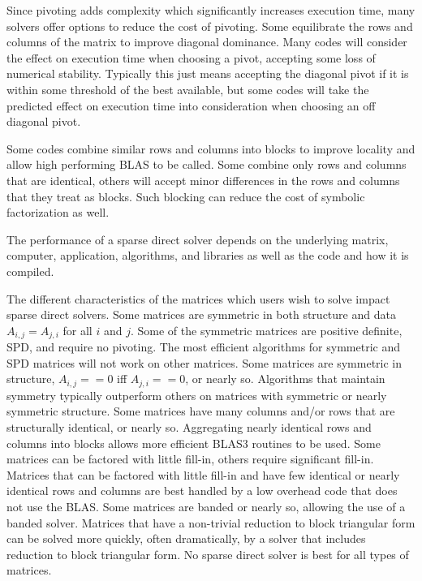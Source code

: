 \documentclass[acmtocl]{acmtrans2m}
\begin{document}
Since pivoting adds complexity which significantly increases execution
time, many solvers offer options to reduce the cost of pivoting\cite{LiDemmel509092,sg:04-fgc}.  Some
equilibrate the rows and columns of the matrix to improve diagonal
dominance.  Many codes will consider the effect on execution time when
choosing a pivot, accepting some loss of numerical stability\cite{Malard126136}.
Typically this just means accepting the diagonal pivot if it is within
some threshold of the best available, but some codes will take the
predicted effect on execution time into consideration when choosing an off
diagonal pivot\cite{Davis992205}.

Some codes combine similar rows and columns into blocks to improve
locality and allow high performing BLAS to be called.  Some combine
only rows and columns that are identical, others will accept minor
differences in the rows and columns that they treat as blocks.  Such
blocking can reduce the cost of symbolic factorization as well\cite{amestoy01analysis}.

The performance of a sparse direct solver depends on the underlying
matrix, computer, application, algorithms, and libraries as well as
the code and how it is compiled.  

The different characteristics of the matrices which users wish to
solve impact sparse direct solvers.  Some matrices are symmetric in both
structure and data $A_{i,j} = A_{j,i}$ for all $i$ and $j$.  Some of
the symmetric matrices are positive definite, SPD, and require no
pivoting.  The most efficient algorithms for symmetric and SPD
matrices will not work on other matrices.  Some matrices are symmetric in
structure, $A_{i,j} == 0$ iff $A_{j,i} == 0$, or nearly so.
Algorithms that maintain symmetry typically outperform others on
matrices with symmetric or nearly symmetric structure.  Some matrices have many
columns and/or rows that are structurally identical, or nearly so.
Aggregating nearly identical rows and columns into blocks allows more
efficient BLAS3 routines to be used.  Some matrices can be factored with little
fill-in, others require significant fill-in.  Matrices that can be
factored with little fill-in and have few identical or nearly identical
rows and columns are best handled by a low overhead code that does not
use the BLAS.  Some matrices are banded or nearly so, allowing the use
of a banded solver.  Matrices that have a non-trivial reduction to
block triangular form can be solved more quickly, often dramatically,
by a solver that includes reduction to block triangular form.  No sparse direct solver is best for all types of matrices.  
\end{document}
